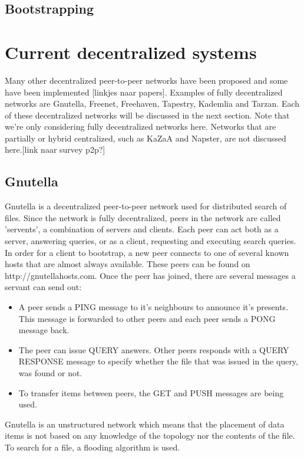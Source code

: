 \documentclass[journal]{IEEEtran}
\begin{document}
		\subsection{Bootstrapping}
	
	\section{Current decentralized systems}
		Many other decentralized peer-to-peer networks have been proposed and some have been implemented [linkjes naar papers]. Examples of fully decentralized networks are Gnutella, Freenet, Freehaven, Tapestry, Kademlia and Tarzan. Each of these decentralized networks will be discussed in the next section. Note that we're only considering fully decentralized networks here. Networks that are partially or hybrid centralized, such as KaZaA and Napster, are not discussed here.[link naar survey p2p?]
	
		\subsection{Gnutella}
			Gnutella is a decentralized peer-to-peer network used for distributed search of files. Since the network is fully decentralized, peers in the network are called 'servents', a combination of servers and clients. Each peer can act both as a server, answering queries, or as a client, requesting and executing search queries. In order for a client to bootstrap, a new peer connects to one of several known hosts that are almost always available. These peers can be found on http://gnutellahosts.com. Once the peer has joined, there are several messages a servant can send out:
		
			\begin{itemize}
				\item A peer sends a PING message to it's neighbours to announce it's presents. This message is forwarded to other peers and each peer sends a PONG message back.
				\item The peer can issue QUERY answers. Other peers responds with a QUERY RESPONSE message to specify whether the file that was issued in the query, was found or not.
				\item To transfer items between peers, the GET and PUSH messages are being used.
			\end{itemize}
			
			Gnutella is an unstructured network which means that the placement of data items is not based on any knowledge of the topology nor the contents of the file. To search for a file, a flooding algorithm is used.
		
\end{document}
